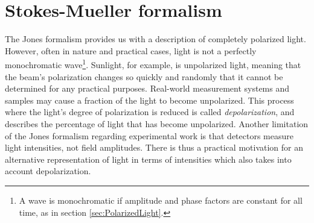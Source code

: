 \section{Stokes-Mueller formalism}
The Jones formalism provides us with a description of completely polarized light. However, often in nature and practical cases, light is not a perfectly monochromatic wave\footnote{A wave is monochromatic if amplitude and phase factors are constant for all time, as in section \ref{sec:PolarizedLight}.}. Sunlight, for example, is unpolarized light, meaning that the beam's polarization changes so quickly and randomly that it cannot be determined for any practical purposes. Real-world measurement systems and samples may cause a fraction of the light to become unpolarized. This process where the light's degree of polarization is reduced is called \emph{depolarization}, and describes the percentage of light that has become unpolarized\cite{hans_arwin}. Another limitation of the Jones formalism regarding experimental work is that detectors measure light intensities, not field amplitudes. There is thus a practical motivation for an alternative representation of light in terms of intensities which also takes into account depolarization.

